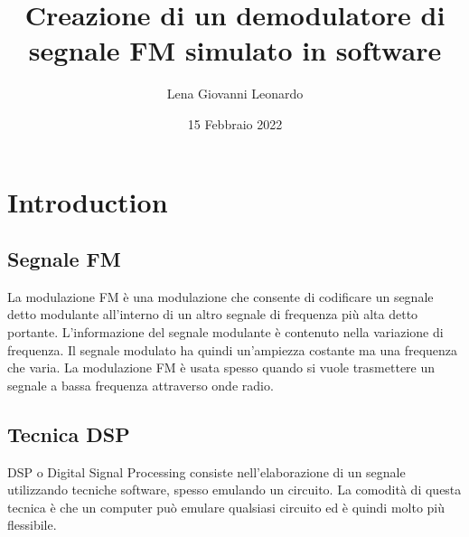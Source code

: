 \documentclass{article}
\title{Creazione di un demodulatore di segnale FM simulato in software}
\author{Lena Giovanni Leonardo}
\date{15 Febbraio 2022}
\begin{document}
\maketitle

\section{Introduction}

\subsection{Segnale FM}
La modulazione FM è una modulazione che consente di codificare un segnale detto modulante all'interno di un altro segnale di frequenza
più alta detto portante. L'informazione del segnale modulante è contenuto nella variazione di frequenza. Il segnale modulato
ha quindi un'ampiezza costante ma una frequenza che varia. La modulazione FM è usata spesso quando si vuole trasmettere un segnale
a bassa frequenza attraverso onde radio.

\subsection{Tecnica DSP}
DSP o Digital Signal Processing consiste nell'elaborazione di un segnale utilizzando tecniche software, spesso emulando un circuito.
La comodità di questa tecnica è che un computer può emulare qualsiasi circuito ed è quindi molto più flessibile.
\end{document}
